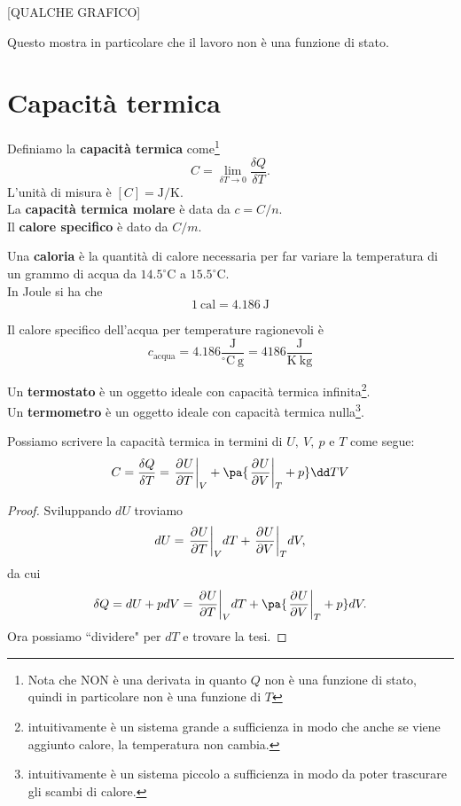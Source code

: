 [QUALCHE GRAFICO]

\noindent
Questo mostra in particolare che il lavoro non \`e una funzione di stato.

\section{Capacit\`a termica}
\begin{definition}
Definiamo la \textbf{capacit\`a termica} come\footnote{Nota che NON \`e una derivata in quanto $Q$ non \`e una funzione di stato, quindi in particolare non \`e una funzione di $T$}
\[C=\lim_{\delta T\to 0}\frac{\delta Q}{\delta T}.\]
L'unit\`a di misura \`e $[C]=\mathrm{J}/\mathrm{K}$.\\
La \textbf{capacit\`a termica molare} \`e data da $c=C/n$.\\
Il \textbf{calore specifico} \`e dato da $C/m$.
\end{definition}

\begin{definition}[Caloria]
Una \textbf{caloria} \`e la quantit\`a di calore necessaria per far variare la temperatura di un grammo di acqua da $14.5^\circ\mathrm{C}$ a $15.5^\circ\mathrm{C}$.\\
In Joule si ha che
\[\boxed{1\ \mathrm{cal}=4.186\ \mathrm{J}}\]
\end{definition}
\begin{remark}
Il calore specifico dell'acqua per temperature ragionevoli \`e
\[c_{\text{acqua}}=4.186\frac{\mathrm{J}}{^\circ\mathrm{C}\ \mathrm{g}}=4186\frac{\mathrm{J}}{\mathrm{K}\ \mathrm{kg}}\]
\end{remark}

\begin{definition}
Un \textbf{termostato} \`e un oggetto ideale con capacit\`a termica infinita\footnote{intuitivamente \`e un sistema grande a sufficienza in modo che anche se viene aggiunto calore, la temperatura non cambia.}.\\ 
Un \textbf{termometro} \`e un oggetto ideale con capacit\`a termica nulla\footnote{intuitivamente \`e un sistema piccolo a sufficienza in modo da poter trascurare gli scambi di calore.}.
\end{definition}

\begin{remark}
Possiamo scrivere la capacit\`a termica in termini di $U,\ V,\ p$ e $T$ come segue:
\[C=\frac{\delta Q}{\delta T}=\ppb TUV+\pa{\ppb VUT+p}\dd TV\]
\end{remark}
\begin{proof}
Sviluppando $dU$ troviamo
\[dU=\ppb TUVdT+\ppb VUTdV,\]
da cui
\[\delta Q=dU+pdV=\ppb TUVdT+\pa{\ppb VUT+p}dV.\]
Ora possiamo ``dividere" per $dT$ e trovare la tesi.
\end{proof}

